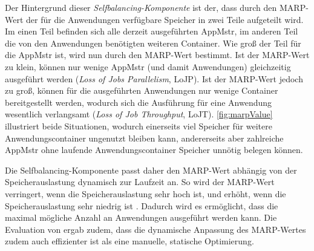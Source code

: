 Der Hintergrund dieser \emph{Selfbalancing-Komponente} ist der, dass durch den \ac{MARP}-Wert der für die Anwendungen verfügbare Speicher in zwei Teile aufgeteilt wird. Im einen Teil befinden sich alle derzeit ausgeführten \ac{AppMstr}, im anderen Teil die von den Anwendungen benötigten weiteren Container. Wie groß der Teil für die \ac{AppMstr} ist, wird nun durch den \ac{MARP}-Wert bestimmt. Ist der \ac{MARP}-Wert zu klein, können nur wenige \ac{AppMstr} (und damit Anwendungen) gleichzeitig ausgeführt werden (\emph{Loss of Jobs Parallelism}, LoJP). Ist der \ac{MARP}-Wert jedoch zu groß, können für die ausgeführten Anwendungen nur wenige Container bereitgestellt werden, wodurch sich die Ausführung für eine Anwendung wesentlich verlangsamt (\emph{Loss of Job Throughput}, LoJT)\cite{zhang2016}. \autoref{fig:marpValue} illustriert beide Situationen, wodurch einerseits viel Speicher für weitere Anwendungscontainer ungenutzt bleiben kann, andererseits aber zahlreiche \ac{AppMstr} ohne laufende Anwendungscontainer Speicher unnötig belegen können.

Die Selfbalancing-Komponente passt daher den \ac{MARP}-Wert abhängig von der Speicherauslastung dynamisch zur Laufzeit an. So wird der \ac{MARP}-Wert verringert, wenn die Speicherauslastung sehr hoch ist, und erhöht, wenn die Speicherauslastung sehr niedrig ist \cite{zhang2016}. Dadurch wird es ermöglicht, dass die maximal mögliche Anzahl an Anwendungen ausgeführt werden kann. Die Evaluation von \citeauthor{zhang2016} ergab zudem, dass die dynamische Anpassung des \ac{MARP}-Wertes zudem auch effizienter ist als eine manuelle, statische Optimierung.
